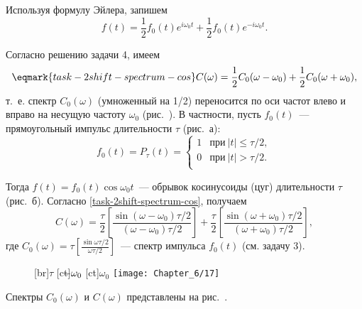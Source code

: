 Используя формулу Эйлера, запишем
\begin{equation*}
    f(t)=\frac{1}{2}f_0(t)e^{i\omega_0t}+\frac{1}{2}f_0(t)e^{-i\omega_0t}.
\end{equation*}

Согласно решению задачи 4, имеем
\begin{equation}
    \eqmark{task-2shift-spectrum-cos}
    C(\omega)=\frac{1}{2}C_0(\omega-\omega_0)+\frac{1}{2}C_0(\omega+\omega_0),
\end{equation}
т.~е. спектр $C_0(\omega)$ (умноженный на 1/2) переносится по оси частот влево и
вправо на несущую частоту $\omega_0$
(рис.~). В частности, пусть $f_0(t)$~---
прямоугольный импульс длительности $\tau$ (рис.~а):
\begin{equation*}
    f_0(t)=P_{\tau}(t)=
    \begin{cases}
        1 & \text{при}~|t|\le\tau/2,\\
        0 & \text{при}~|t|>\tau/2.\\
    \end{cases}
\end{equation*}

Тогда $f(t)=f_0(t)\cos\omega_0 t$~--- обрывок косинусоиды (цуг) длительности
$\tau$ (рис.~б). Согласно
\eqref{task-2shift-spectrum-cos},
получаем
\begin{equation*}
C(\omega)=\frac{\tau}{2}\left[\frac{\sin(\omega-\omega_0)\tau/2}{
(\omega-\omega_0)\tau/2}\right]+
\frac{\tau}{2}\left[\frac{\sin(\omega+\omega_0)\tau/2}{(\omega+\omega_0)\tau/2}
\right],
\end{equation*}
где $C_0(\omega)=\tau\left[\frac{\sin\omega\tau/2}{\omega\tau/2}\right]$~---
спектр импульса $f_0(t)$ (см. задачу 3).

\begin{figure}
    [br]{$\tau$}
    [ct]{$\llap{$-$}\omega_0$}
    [ct]{$\omega_0$}
    \texttt{[image: Chapter\_6/17]}
    \caption{}
\end{figure}

Спектры $C_0(\omega)$ и $C(\omega)$ представлены на
рис.~.

